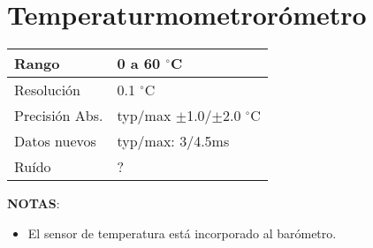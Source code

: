 \documentclass[spanish,12pt,a4paper,titlepage]{report}
\begin{document}
\section{Temperaturmometrorómetro}
\label{sec:temp}

\begin{table}[H]
\begin{center}
\begin{tabular}{|p{3cm}|p{6.5cm}|}
\hline
Rango & 0 a 60 $^\circ$C\\
\hline
Resolución &  0.1 $^\circ$C\\
\hline
Precisión Abs. & typ/max $\pm$1.0/$\pm$2.0 $^\circ$C\\
\hline
Datos nuevos &  typ/max: 3/4.5ms\\
\hline
Ruído & ? \\
\hline
\end{tabular}
\label{tab:temp}
\end{center}
\end{table}

\textbf{NOTAS}:
\begin{itemize}
\item El sensor de temperatura está incorporado al barómetro.
\end{itemize}
\end{document}
